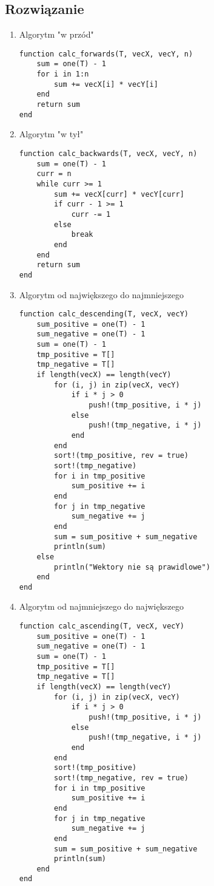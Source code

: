 \documentclass[11pt]{article}
\begin{document}
\subsection{Rozwiązanie}
\begin{enumerate}
    \item Algorytm "w przód"
\begin{verbatim}
function calc_forwards(T, vecX, vecY, n)
    sum = one(T) - 1
    for i in 1:n 
        sum += vecX[i] * vecY[i]
    end
    return sum
end
\end{verbatim}
    \item Algorytm "w tył"
\begin{verbatim}
function calc_backwards(T, vecX, vecY, n)
    sum = one(T) - 1
    curr = n
    while curr >= 1
        sum += vecX[curr] * vecY[curr]
        if curr - 1 >= 1
            curr -= 1
        else
            break
        end
    end
    return sum
end
\end{verbatim}
    \item Algorytm od największego do najmniejszego
\begin{verbatim}
function calc_descending(T, vecX, vecY) 
    sum_positive = one(T) - 1
    sum_negative = one(T) - 1
    sum = one(T) - 1
    tmp_positive = T[]
    tmp_negative = T[]
    if length(vecX) == length(vecY)
        for (i, j) in zip(vecX, vecY)
            if i * j > 0
                push!(tmp_positive, i * j)
            else 
                push!(tmp_negative, i * j)
            end
        end
        sort!(tmp_positive, rev = true)
        sort!(tmp_negative)
        for i in tmp_positive
            sum_positive += i
        end 
        for j in tmp_negative 
            sum_negative += j
        end
        sum = sum_positive + sum_negative
        println(sum)
    else
        println("Wektory nie są prawidlowe")
    end
end
\end{verbatim}
    \item Algorytm od najmniejszego do największego
    \newpage
\begin{verbatim}
function calc_ascending(T, vecX, vecY)
    sum_positive = one(T) - 1
    sum_negative = one(T) - 1
    sum = one(T) - 1
    tmp_positive = T[]
    tmp_negative = T[]
    if length(vecX) == length(vecY)
        for (i, j) in zip(vecX, vecY)
            if i * j > 0
                push!(tmp_positive, i * j)
            else 
                push!(tmp_negative, i * j)
            end
        end
        sort!(tmp_positive)
        sort!(tmp_negative, rev = true)
        for i in tmp_positive
            sum_positive += i
        end 
        for j in tmp_negative
            sum_negative += j 
        end
        sum = sum_positive + sum_negative
        println(sum)
    end
end
\end{verbatim}
\end{enumerate}
\end{document}
